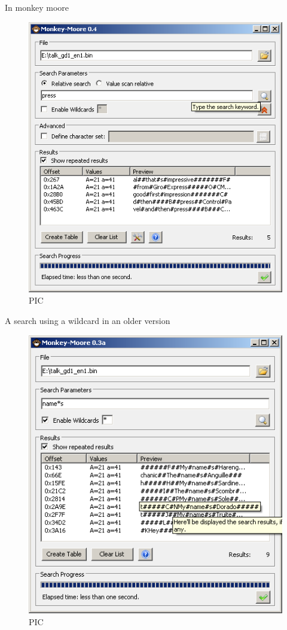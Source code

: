 \documentclass[
]{book}
\begin{document}
In monkey moore

\begin{figure}
\centering
\includegraphics{images/81_home_fast6191_romhackingguide_unrenamed_file___al_borders_romhackingguiderelativesearchmm4.png}
\caption{PIC}
\end{figure}

A search using a wildcard in an older version

\begin{figure}
\centering
\includegraphics{images/82_home_fast6191_romhackingguide_unrenamed_file___al_borders_romhackingguiderelativesearchmm2.png}
\caption{PIC}
\end{figure}
\end{document}
